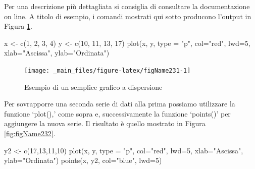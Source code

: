 \documentclass[a4paper,12pt,oneside]{book}
\newenvironment{Shaded}{\begin{snugshade}}{\end{snugshade}}
\newcommand{\DecValTok}[1]{#1}
\newcommand{\StringTok}[1]{#1}
\newcommand{\OtherTok}[1]{#1}
\newcommand{\FunctionTok}[1]{#1}
\newcommand{\AttributeTok}[1]{#1}
\newcommand{\NormalTok}[1]{#1}
\begin{document}
Per una descrizione più dettagliata si consiglia di consultare la documentazione on line. A titolo di esempio, i comandi mostrati qui sotto producono l'output in Figura \ref{fig:figName231}.

\begin{Shaded}
\begin{Highlighting}[]
\NormalTok{x  }\OtherTok{\textless{}{-}}  \FunctionTok{c}\NormalTok{(}\DecValTok{1}\NormalTok{, }\DecValTok{2}\NormalTok{, }\DecValTok{3}\NormalTok{, }\DecValTok{4}\NormalTok{)}
\NormalTok{y  }\OtherTok{\textless{}{-}}  \FunctionTok{c}\NormalTok{(}\DecValTok{10}\NormalTok{, }\DecValTok{11}\NormalTok{, }\DecValTok{13}\NormalTok{, }\DecValTok{17}\NormalTok{)}
\FunctionTok{plot}\NormalTok{(x, y, }\AttributeTok{type =} \StringTok{"p"}\NormalTok{, }\AttributeTok{col=}\StringTok{"red"}\NormalTok{, }\AttributeTok{lwd=}\DecValTok{5}\NormalTok{, }\AttributeTok{xlab=}\StringTok{"Ascissa"}\NormalTok{, }\AttributeTok{ylab=}\StringTok{"Ordinata"}\NormalTok{)}
\end{Highlighting}
\end{Shaded}

\begin{figure}

{\centering \texttt{[image: \_main\_files/figure-latex/figName231-1]} 

}

\caption{Esempio di un semplice grafico a dispersione}\label{fig:figName231}
\end{figure}

Per sovrapporre una seconda serie di dati alla prima possiamo utilizzare la funzione `plot(),' come sopra e, successivamente la funzione `points()' per aggiungere la nuova serie. Il risultato è quello mostrato in Figura \ref{fig:figName232}.

\begin{Shaded}
\begin{Highlighting}[]
\NormalTok{y2  }\OtherTok{\textless{}{-}}  \FunctionTok{c}\NormalTok{(}\DecValTok{17}\NormalTok{,}\DecValTok{13}\NormalTok{,}\DecValTok{11}\NormalTok{,}\DecValTok{10}\NormalTok{)}
\FunctionTok{plot}\NormalTok{(x, y, }\AttributeTok{type =} \StringTok{"p"}\NormalTok{, }\AttributeTok{col=}\StringTok{"red"}\NormalTok{, }\AttributeTok{lwd=}\DecValTok{5}\NormalTok{, }\AttributeTok{xlab=}\StringTok{"Ascissa"}\NormalTok{, }\AttributeTok{ylab=}\StringTok{"Ordinata"}\NormalTok{)}
\FunctionTok{points}\NormalTok{(x, y2, }\AttributeTok{col=}\StringTok{"blue"}\NormalTok{, }\AttributeTok{lwd=}\DecValTok{5}\NormalTok{)}
\end{Highlighting}
\end{Shaded}
\end{document}
